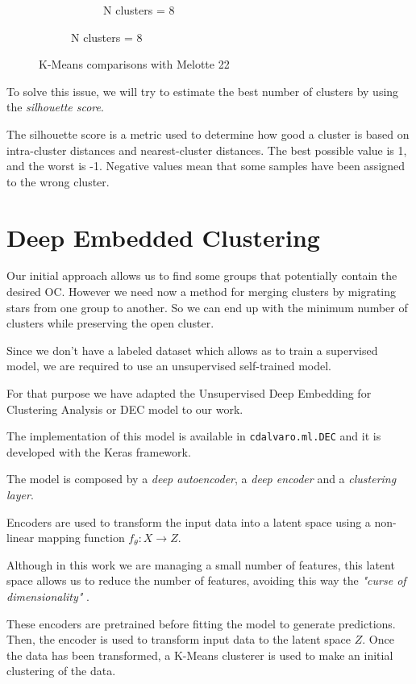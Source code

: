 \documentclass[11pt, a4paper, english]{book}
\begin{document}
\begin{figure}[htbp]
\begin{subfigure}{0.9\textwidth}
\begin{subfigure}[t]{0.3\textwidth}
      \caption{N clusters = 8}
    \end{subfigure}
  \end{subfigure}
  \caption{K-Means comparisons with Melotte 22}
  \label{fig:kmeans_comparisons_melotte_22}
\end{figure}

To solve this issue, we will try to estimate the best number of clusters by using the \emph{silhouette score}.

The silhouette score is a metric used to determine how good a cluster is based on intra-cluster distances and nearest-cluster distances.
The best possible value is 1, and the worst is -1. Negative values mean that some samples have been assigned to the wrong cluster.

\section{Deep Embedded Clustering}

Our initial approach allows us to find some groups that potentially contain the desired OC. However we need now a method for merging clusters
by migrating stars from one group to another. So we can end up with the minimum number of clusters while preserving the open cluster.

Since we don't have a labeled dataset which allows as to train a supervised model, we are required to use an unsupervised self-trained model.

For that purpose we have adapted the Unsupervised Deep Embedding for Clustering Analysis or DEC model \cite{xie2016unsupervised} to our work.

The implementation of this model is available in \verb|cdalvaro.ml.DEC| and it is developed with the Keras framework.

The model is composed by a \emph{deep autoencoder}, a \emph{deep encoder} and a \emph{clustering layer}.

Encoders are used to transform the input data into a latent space using a non-linear mapping function $f_{\theta} : X \rightarrow Z$.

Although in this work we are managing a small number of features, this latent space allows us to reduce the number of features, avoiding
this way the \emph{"curse of dimensionality"} \cite{bellman1961curse}.

These encoders are pretrained before fitting the model to generate predictions. Then, the encoder is used to transform input data to the
latent space $Z$. Once the data has been transformed, a K-Means clusterer is used to make an initial clustering of the data.
\end{document}
